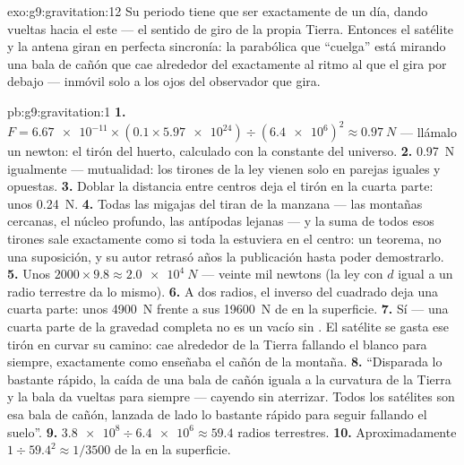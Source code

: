 \begin{solution}{exo:g9:gravitation:12}
Su periodo tiene que ser exactamente de un día, dando vueltas hacia el
este --- el sentido de giro de la propia Tierra. Entonces el satélite y
la antena giran en perfecta sincronía: la parabólica que ``cuelga''
está mirando una bala de cañón que cae alrededor del
 exactamente al ritmo al que el  gira por
debajo --- inmóvil solo a los ojos del observador que gira.
\end{solution}

\begin{solution}{pb:g9:gravitation:1}
\textbf{1.} $F = \num{6.67e-11} \times (0.1 \times \num{5.97e24}) \div
(\num{6.4e6})^2 \approx \qty{0.97}{N}$ --- llámalo un newton: el tirón
del huerto, calculado con la constante del universo.
\textbf{2.} \qty{0.97}{N} igualmente --- mutualidad: los tirones de la
ley vienen solo en parejas iguales y opuestas.
\textbf{3.} Doblar la distancia entre centros deja el tirón en la
cuarta parte: unos \qty{0.24}{N}.
\textbf{4.} Todas las migajas del  tiran de la manzana ---
las montañas cercanas, el núcleo profundo, las antípodas lejanas --- y
la suma de todos esos tirones sale exactamente como si toda la
 estuviera en el centro: un teorema, no una suposición, y su
autor retrasó años la publicación hasta poder demostrarlo.
\textbf{5.} Unos $2000 \times 9.8 \approx \qty{2.0e4}{N}$ --- veinte
mil newtons (la ley con $d$ igual a un radio terrestre da lo mismo).
\textbf{6.} A dos radios, el inverso del cuadrado deja una cuarta
parte: unos \qty{4900}{N} frente a sus \qty{19600}{N} de
 en la superficie.
\textbf{7.} Sí --- una cuarta parte de la gravedad completa no es un
vacío sin . El satélite se gasta ese tirón en curvar su camino: cae
alrededor de la Tierra fallando el blanco para siempre, exactamente
como enseñaba el cañón de la montaña.
\textbf{8.} ``Disparada lo bastante rápido, la caída de una bala de
cañón iguala a la curvatura de la Tierra y la bala da vueltas para
siempre --- cayendo sin aterrizar. Todos los satélites son esa bala de
cañón, lanzada de lado lo bastante rápido para seguir fallando el
suelo''.
\textbf{9.} $\num{3.8e8} \div \num{6.4e6} \approx 59.4$ radios
terrestres.
\textbf{10.} Aproximadamente $1 \div 59.4^2 \approx 1/3500$ de la
 en la superficie.

\end{solution}
